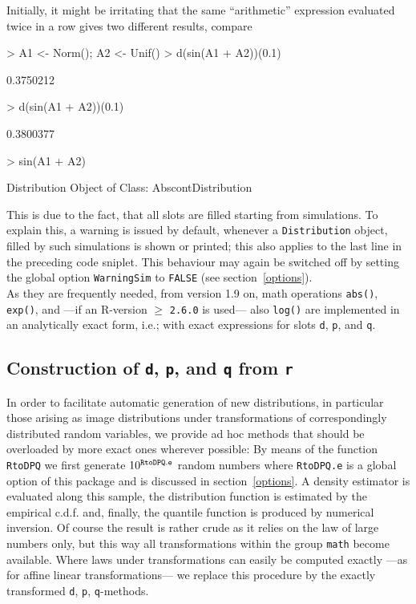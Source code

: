 \documentclass[11pt]{article}
\newcommand{\code}[1]{{\tt #1}}
\begin{document}
Initially, it might be irritating that the same ``arithmetic'' expression
evaluated twice in a row gives two different results, compare
\begin{Schunk}
\begin{Sinput}
>   A1 <- Norm(); A2 <- Unif()
>   d(sin(A1 + A2))(0.1)
\end{Sinput}
\begin{Soutput}
[1] 0.3750212
\end{Soutput}
\begin{Sinput}
>   d(sin(A1 + A2))(0.1)
\end{Sinput}
\begin{Soutput}
[1] 0.3800377
\end{Soutput}
\begin{Sinput}
>   sin(A1 + A2)
\end{Sinput}
\begin{Soutput}
Distribution Object of Class: AbscontDistribution
\end{Soutput}
\end{Schunk}
This is due to the fact, that all slots are filled starting from simulations.
To explain this, a warning is issued  by default, whenever a \code{Distribution}
object, filled by such simulations is shown or printed; this also applies to the 
last line in the preceding code sniplet. This behaviour may again be switched 
off by setting the global option
\code{WarningSim} to \code{FALSE} (see section~\ref{options}).\\

As they are frequently needed, from version 1.9 on, math operations 
\code{abs()}, \code{exp()}, and ---if an {\sf R}-version $\ge$ {\tt 2.6.0} is 
used--- also \code{log()} are implemented in an analytically exact form, 
i.e.; with exact expressions for slots \code{d}, \code{p}, and \code{q}.

%
\subsection{Construction of \code{d}, \code{p}, and \code{q} from \code{r}}
%
In order to facilitate automatic generation of new distributions, in particular 
those arising as image distributions under transformations of correspondingly 
distributed random variables, we provide ad hoc methods that should be 
overloaded by more exact ones wherever possible: By means of the function 
\code{RtoDPQ} we first generate $10^{\footnotesize\tt RtoDPQ.e}$
random numbers where \code{RtoDPQ.e} is a global option of this package and is 
discussed in section~{\ref{options}}. %
A density estimator is evaluated along this sample, the distribution function is 
estimated by the empirical c.d.f. and, finally, the quantile function is 
produced by numerical inversion.
Of course the result is rather crude as it relies on the law of large numbers 
only, but this way all transformations within the group \code{math} become 
available.
Where laws under transformations can easily be computed exactly ---as for affine
linear transformations--- we replace this procedure by the exactly transformed
\code{d}, \code{p}, \code{q}-methods.
%
\end{document}
